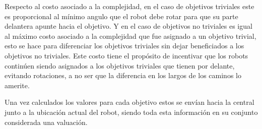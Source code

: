 Respecto al costo asociado a la complejidad, en el caso de objetivos triviales
este es proporcional al mínimo angulo que el robot debe rotar para que su parte
delantera apunte hacia el objetivo. Y en el caso de objetivos no triviales es
igual al máximo costo asociado a la complejidad que fue asignado a un objetivo
trivial, esto se hace para diferenciar los objetivos triviales sin dejar
beneficiados a los objetivos no triviales. Este costo tiene el propósito de
incentivar que los robots continúen siendo asignados a los objetivos triviales que
tienen por delante, evitando rotaciones, a no ser que la diferencia en los largos de
los caminos lo amerite.

Una vez calculados los valores para cada objetivo estos se envían hacia la central
junto a la ubicación actual del robot, siendo toda esta información en su
conjunto considerada una valuación. %






